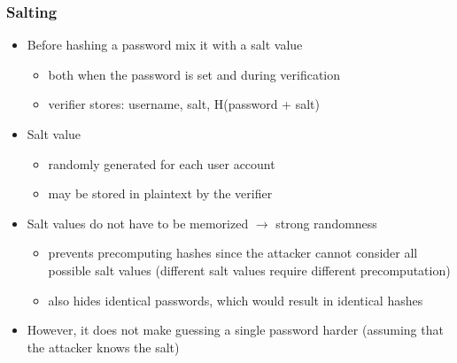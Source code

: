 \documentclass[final]{article}
\begin{document}
\subsubsection*{Salting}
\begin{itemize}[nosep]
    \item Before hashing a password mix it with a salt value
          \begin{itemize}[nosep]
              \item both when the password is set and during verification
              \item verifier stores: username, salt, H(password + salt)
          \end{itemize}
    \item Salt value
          \begin{itemize}
              \item randomly generated for each user account
              \item may be stored in plaintext by the verifier
          \end{itemize}
    \item Salt values do not have to be memorized $\rightarrow$ strong randomness
          \begin{itemize}
              \item prevents precomputing hashes since the attacker cannot consider all possible salt values (different salt values require different precomputation)
              \item also hides identical passwords, which would result in identical hashes
          \end{itemize}
    \item However, it does not make guessing a single password harder (assuming that the attacker knows the salt)
\end{itemize}
\end{document}
